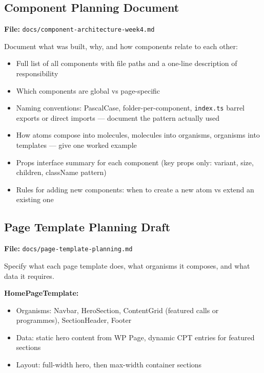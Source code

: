\documentclass[12pt,a4paper]{article}
\begin{document}
\subsection{Component Planning Document}

\textbf{File:} \texttt{docs/component-architecture-week4.md}

Document what was built, why, and how components relate to each other:

\begin{itemize}
    \item Full list of all components with file paths and a one-line description of responsibility
    \item Which components are global vs page-specific
    \item Naming conventions: PascalCase, folder-per-component, \texttt{index.ts} barrel exports or direct imports --- document the pattern actually used
    \item How atoms compose into molecules, molecules into organisms, organisms into templates --- give one worked example
    \item Props interface summary for each component (key props only: variant, size, children, className pattern)
    \item Rules for adding new components: when to create a new atom vs extend an existing one
\end{itemize}

\subsection{Page Template Planning Draft}

\textbf{File:} \texttt{docs/page-template-planning.md}

Specify what each page template does, what organisms it composes, and what data it requires.

\vspace{0.8em}
\noindent\textbf{HomePageTemplate:}

\begin{itemize}
    \item Organisms: Navbar, HeroSection, ContentGrid (featured calls or programmes), SectionHeader, Footer
    \item Data: static hero content from WP Page, dynamic CPT entries for featured sections
    \item Layout: full-width hero, then max-width container sections
\end{itemize}
\end{document}
